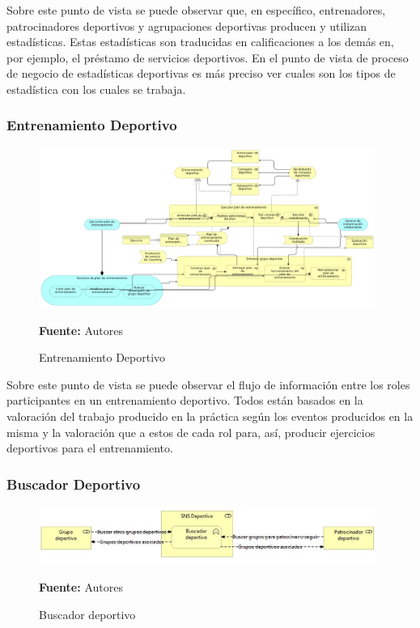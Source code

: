 Sobre este punto de vista se puede observar que, en específico, entrenadores, patrocinadores deportivos y agrupaciones deportivas producen y utilizan estadísticas. Estas estadísticas son traducidas en calificaciones a los demás en, por ejemplo, el préstamo de servicios deportivos. En el punto de vista de proceso de negocio de estadísticas deportivas es más preciso ver cuales son los tipos de estadística con los cuales se trabaja.

\subsubsection{Entrenamiento Deportivo}

\begin{figure}[!htb]
  \begin{center}
    \includegraphics[width=11cm]{./imagenes/business_functions/entrenamientodeportivo.png}
    \caption{Entrenamiento Deportivo}
    \label{fig:bf_entrenamiento_deportivo}
    \textbf{Fuente:}  Autores
  \end{center}
\end{figure}

Sobre este punto de vista se puede observar el flujo de información entre los roles participantes en un entrenamiento deportivo. Todos están basados en la valoración del trabajo producido en la práctica según los eventos producidos en la misma y la valoración que a estos de cada rol para, así, producir ejercicios deportivos para el entrenamiento.

\subsubsection{Buscador Deportivo}

\begin{figure}[!htb]
  \begin{center}
    \includegraphics[width=11cm]{./imagenes/business_functions/buscadordeportivo.png}
    \caption{Buscador deportivo}
    \label{fig:BF_BuscadorDeportivo}
    \textbf{Fuente:}  Autores
  \end{center}
\end{figure}

